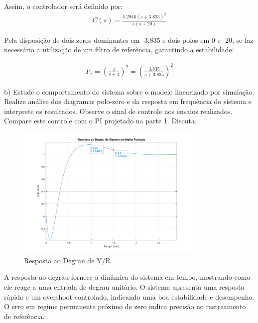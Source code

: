 \documentclass[a4paper,12pt]{article}
\begin{document}
 Assim, o controlador será definido por:
\begin{align}
  C(s)=\frac{5.2946(s+3.835)^2}{s(s+20)}  
\end{align}

Pela disposição de dois zeros dominantes em -3.835 e dois polos em 0 e -20, se faz necessário a utilização de um filtro de referência, garantindo a estabilidade:

\begin{align}
    F_r=\left (\frac{z}{s+z}\right)^2 = \left (\frac{3.835}{s+3.835}\right)^2
\end{align}
 
b) Estude o comportamento do sistema sobre o modelo linearizado por simulação.
Realize análise dos diagramas polo-zero e da resposta em frequência do sistema e 
interprete os resultados. Observe o sinal de controle nos ensaios realizados. 
Compare este controle com o PI projetado na parte 1. Discuta.

\begin{figure}[H]
    \centering %
    \includegraphics[width=0.8\textwidth]{Imagens/1B/1BRespostaMFDegrauAutoral2.png} %
    \caption{Resposta ao Degrau de Y/R}
    \label{fig:exemplo} %
\end{figure}

A resposta ao degrau fornece a dinâmica do sistema em tempo, mostrando como ele reage a uma entrada de degrau unitário. O sistema apresenta uma resposta rápida e um overshoot controlado, indicando uma boa estabilidade e desempenho. O erro em regime permanente próximo de zero indica precisão no rastreamento de referência.
\end{document}
